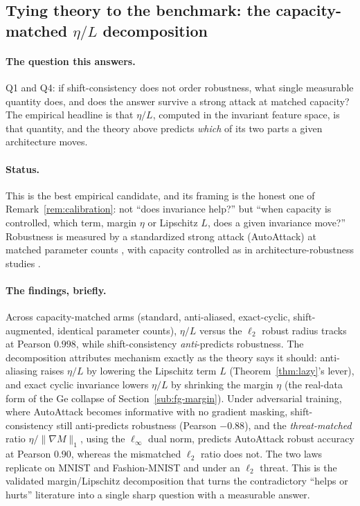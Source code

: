\subsection{Tying theory to the benchmark: the capacity-matched $\eta/L$ decomposition}
\label{sub:empirical}

\paragraph{The question this answers.}
Q1 and Q4: if shift-consistency does not order robustness, what single measurable quantity does, and
does the answer survive a strong attack at matched capacity? The empirical headline is that $\eta/L$,
computed in the invariant feature space, is that quantity, and the theory above predicts \emph{which}
of its two parts a given architecture moves.

\paragraph{Status.}
This is the best empirical candidate, and its framing is the honest one of
Remark~\ref{rem:calibration}: not ``does invariance help?'' but ``when capacity is controlled, which
term, margin $\eta$ or Lipschitz $L$, does a given invariance move?'' Robustness is measured by a
standardized strong attack (AutoAttack) at matched parameter counts \citep{croce2020reliable,robustbench2020},
with capacity controlled as in architecture-robustness studies \citep{robarch2023}.

\paragraph{The findings, briefly.}
Across capacity-matched arms (standard, anti-aliased, exact-cyclic, shift-augmented, identical
parameter counts), $\eta/L$ versus the $\ell_2$ robust radius tracks at Pearson $0.998$, while
shift-consistency \emph{anti}-predicts robustness. The decomposition attributes mechanism exactly as
the theory says it should: anti-aliasing raises $\eta/L$ by lowering the Lipschitz term $L$
(Theorem~\ref{thm:lazy}'s lever), and exact cyclic invariance lowers $\eta/L$ by shrinking the margin
$\eta$ (the real-data form of the Ge collapse of Section~\ref{sub:fg-margin}). Under adversarial
training, where AutoAttack becomes informative with no gradient masking, shift-consistency still
anti-predicts robustness (Pearson $-0.88$), and the \emph{threat-matched} ratio
$\eta/\|\nabla M\|_1$, using the $\ell_\infty$ dual norm, predicts AutoAttack robust accuracy at
Pearson $0.90$, whereas the mismatched $\ell_2$ ratio does not. The two laws replicate on MNIST and
Fashion-MNIST and under an $\ell_2$ threat. This is the validated margin/Lipschitz decomposition that
turns the contradictory ``helps or hurts'' literature into a single sharp question with a measurable
answer.


